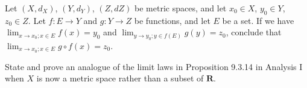 \begin{exercise}\label{ex 3.1.5}
    Let \((X, d_X)\), \((Y, d_Y)\), \((Z, d Z)\) be metric spaces, and let \(x_0 \in X\), \(y_0 \in Y\), \(z_0 \in Z\).
    Let \(f : E \to Y\) and \(g : Y \to Z\) be functions, and let \(E\) be a set.
    If we have \(\lim_{x \to x_0 ; x \in E} f(x) = y_0\) and \(\lim_{y \to y_0 ; y \in f(E)} g(y) = z_0\), conclude that \(\lim_{x \to x_0 ; x \in E} g \circ f(x) = z_0\).
\end{exercise}

\begin{exercise}\label{ex 3.1.6}
    State and prove an analogue of the limit laws in Proposition 9.3.14 in Analysis I when \(X\) is now a metric space rather than a subset of \(\mathbf{R}\).
\end{exercise}